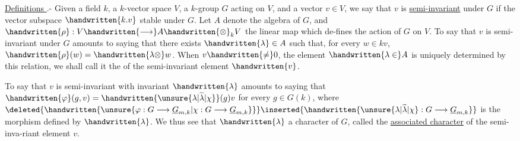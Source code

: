 \uline{Definitions }.- Given a field $k$, a $k$-vector space $V$, a $k$-group $G$ acting on $V$, and a vector $v\in V$, we say that $v$ is \uline{semi-invariant} under $G$ if the vector subspace $\handwritten{k.v}$  stable under $G$.
Let $A$ denote the algebra of $G$, and $\handwritten{\rho}:V\handwritten{\longrightarrow}A\handwritten{\otimes}_k V$ the linear map which de-\linebreak fines the action of $G$ on $V$. To say that $v$ is semi-invariant under $G$ amounts to saying  that there exists $\handwritten{\lambda}\in A$ such that, for every $w\in kv$, $\handwritten{\rho}(w)=\handwritten{\lambda\otimes}w$. When $v\handwritten{\neq}0$, the element $\handwritten{\lambda\in}A$ is uniquely determined by this relation, we shall call it the  of the semi-invariant element $\handwritten{v}$.

 To say that $v$ is semi-invariant  with invariant $\handwritten{\lambda}$ amounts to saying that $\handwritten{\varphi}(g,v)=\handwritten{\unsure{\lambda|\widetilde{\lambda}|\chi}}(g)v$ for every $g\in G(k)$, where $\deleted{\handwritten{\unsure{\varphi:G\longrightarrow\underline{G}_{m,k}|\chi:G\longrightarrow\underline{G}_{m,k}}}}\inserted{\handwritten{\unsure{\lambda|\widetilde{\lambda}|\chi}:G\longrightarrow\underline{G}_{m,k}}}$ is the morphism defined by $\handwritten{\lambda}$. We thus see that $\handwritten{\lambda}$  a character \deleted{\handwritten{\unsure{$\chi$}}} of $G$, called the \uline{associated character} of the semi-inva-\linebreak riant element $v$. 
\margin{\handwritten{!}}
